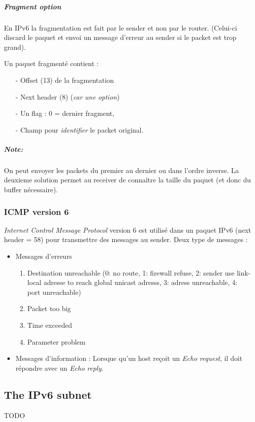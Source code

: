 \subparagraph{Fragment option}
En IPv6 la fragmentation est fait par le sender et non par le router. (Celui-ci discard
le paquet et envoi un message d'erreur au sender si le packet est trop grand).

Un paquet fragmenté contient :
\begin{itemize} 
    \item[-] Offset (13) de la fragmentation
    \item[-] Next header (8) (\textit{car une option})
    \item[-] Un flag : 0 = dernier fragment,
    \item[-] Champ pour \textit{identifier} le packet original.
\end{itemize}

\subparagraph{Note:} On peut envoyer les packets du premier au dernier ou dans l'ordre inverse.
La deuxieme solution permet au receiver de connaître la taille du paquet (et donc du buffer
nécessaire).

\subsubsection{ICMP version 6}
\textit{Internet Control Message Protocol} version 6 est utilisé dans un paquet IPv6
(next header = 58) pour transmettre des messages au sender. Deux type de messages :

\begin{itemize}
    \item Messages d'erreurs
        \begin{enumerate}
            \item Destination unreachable (0: no route, 1: firewall refuse, 2: sender use link-local adresse to reach global unicast adresss, 3: adress unreachable, 4: port unreachable)
            \item Packet too big
            \item Time exceeded
            \item Parameter problem
        \end{enumerate}
    \item Messages d'information : Lorsque qu'un host reçoit un \textit{Echo request},
        il doit répondre avec un \textit{Echo reply}.
\end{itemize}

\subsection{The IPv6 subnet}
TODO

